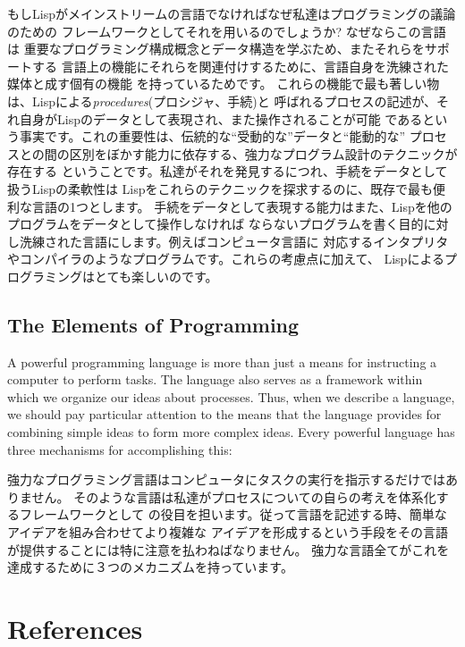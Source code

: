 \documentclass[8pt,oneside]{book}
\newcommand{\newterm}[1]{\index{#1}\emph{#1}}
\begin{document}
もしLispがメインストリームの言語でなければなぜ私達はプログラミングの議論のための
フレームワークとしてそれを用いるのでしょうか? なぜならこの言語は
重要なプログラミング構成概念とデータ構造を学ぶため、またそれらをサポートする
言語上の機能にそれらを関連付けするために、言語自身を洗練された媒体と成す個有の機能
を持っているためです。
これらの機能で最も著しい物は、Lispによる\newterm{procedures}(プロシジャ、手続)と
呼ばれるプロセスの記述が、それ自身がLispのデータとして表現され、また操作されることが可能
であるという事実です。これの重要性は、伝統的な``受動的な''データと``能動的な''
プロセスとの間の区別をぼかす能力に依存する、強力なプログラム設計のテクニックが存在する
ということです。私達がそれを発見するにつれ、手続をデータとして扱うLispの柔軟性は
Lispをこれらのテクニックを探求するのに、既存で最も便利な言語の1つとします。
手続をデータとして表現する能力はまた、Lispを他のプログラムをデータとして操作しなければ
ならないプログラムを書く目的に対し洗練された言語にします。例えばコンピュータ言語に
対応するインタプリタやコンパイラのようなプログラムです。これらの考慮点に加えて、
Lispによるプログラミングはとても楽しいのです。



\label{Section 1.1}
\section{The Elements of Programming}

A powerful programming language is more than just a means for instructing a
computer to perform tasks.  The language also serves as a framework within
which we organize our ideas about processes.  Thus, when we describe a
language, we should pay particular attention to the means that the language
provides for combining simple ideas to form more complex ideas.  Every powerful
language has three mechanisms for accomplishing this:

強力なプログラミング言語はコンピュータにタスクの実行を指示するだけではありません。
そのような言語は私達がプロセスについての自らの考えを体系化するフレームワークとして
の役目を担います。従って言語を記述する時、簡単なアイデアを組み合わせてより複雑な
アイデアを形成するという手段をその言語が提供することには特に注意を払わねばなりません。
強力な言語全てがこれを達成するために３つのメカニズムを持っています。

\chapter*{References}
\label{References}
\end{document}
